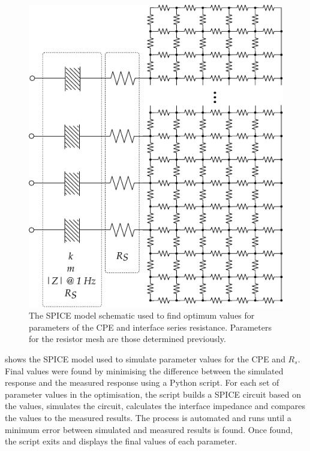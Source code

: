       \begin{figure}[ht]
        \centering
        \includegraphics{content/pt2/08-InterfaceParameters/graphics/SpiceModel_opitimisation}
        \caption{\label{fig:pt2-spiceModel_optimisation}The SPICE model schematic used to find optimum values for parameters of the CPE and interface series resistance. Parameters for the resistor mesh are those determined previously.}
      \end{figure}
       shows the SPICE model used to simulate parameter values for the CPE and $R_{s}$.
      Final values were found by minimising the difference between the simulated response and the measured response using a Python script.
      For each set of parameter values in the optimisation, the script builds a SPICE circuit based on the values, simulates the circuit, calculates the interface impedance and compares the values to the measured results.
      The process is automated and runs until a minimum error between simulated and measured results is found.
      Once found, the script exits and displays the final values of each parameter.

